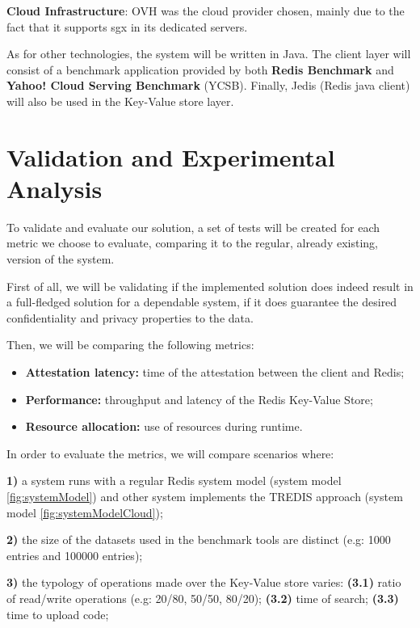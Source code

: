 \textbf{Cloud Infrastructure}: OVH \cite{ovhCloud} was the cloud provider chosen, mainly due to the fact that it supports \gls{sgx} in its dedicated servers.

As for other technologies, the system will be written in Java. The client layer will consist of a benchmark application provided by both \textbf{Redis Benchmark} and \textbf{Yahoo! Cloud Serving Benchmark} (YCSB). Finally, Jedis (Redis java client) will also be used in the Key-Value store layer.

\section{Validation and Experimental Analysis} %
\label{sec:floats_figures_and_captions}

To validate and evaluate our solution, a set of tests will be created for each metric we choose to evaluate, comparing it to the regular, already existing, version of the system. 

First of all, we will be validating if the implemented solution does indeed result in a full-fledged solution for a dependable system, if it does guarantee the desired confidentiality and privacy properties to the data.

Then, we will be comparing the following metrics:

\begin{itemize}
	\item \textbf{Attestation latency:} time of the attestation between the client and Redis;
	\item \textbf{Performance:} throughput and latency of the Redis Key-Value Store;
	\item \textbf{Resource allocation:} use of resources during runtime.
\end{itemize}

In order to evaluate the metrics, we will compare scenarios where:

\textbf{1)} a system runs with a regular Redis system model (system model \ref{fig:systemModel}) and other system implements the TREDIS approach (system model \ref{fig:systemModelCloud});

\textbf{2)} the size of the datasets used in the benchmark tools are distinct (e.g: 1000 entries and 100000 entries);

\textbf{3)} the typology of operations made over the Key-Value store varies: \textbf{(3.1)} ratio of read/write operations (e.g: 20/80, 50/50, 80/20); \textbf{(3.2)} time of search; \textbf{(3.3)} time to upload code;


